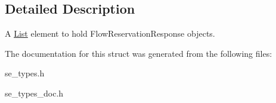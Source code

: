 \subsection{Detailed Description}
A \hyperlink{structList}{List} element to hold Flow\+Reservation\+Response objects. 

The documentation for this struct was generated from the following files\+:\begin{DoxyCompactItemize}
\item 
se\+\_\+types.\+h\item 
se\+\_\+types\+\_\+doc.\+h\end{DoxyCompactItemize}
